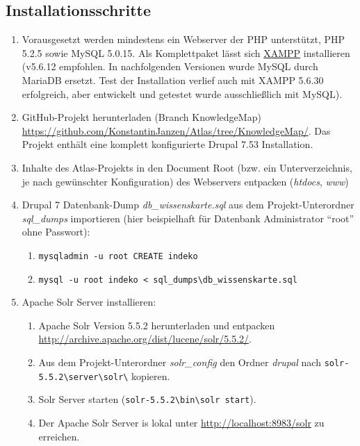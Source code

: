\subsection{Installationsschritte}
\begin{enumerate}
	\item Vorausgesetzt werden mindestens ein Webserver der PHP unterstützt, PHP 5.2.5 sowie MySQL 5.0.15. Als Komplettpaket lässt sich \zB \href{https://www.apachefriends.org/de/download.html}{XAMPP} installieren (v5.6.12 empfohlen. In nachfolgenden Versionen wurde MySQL durch MariaDB ersetzt. Test der Installation verlief auch mit XAMPP 5.6.30 erfolgreich, aber entwickelt und getestet wurde ausschließlich mit MySQL).

	\item GitHub-Projekt herunterladen (Branch KnowledgeMap) \url{https://github.com/KonstantinJanzen/Atlas/tree/KnowledgeMap/}.
	Das Projekt enthält eine komplett konfigurierte Drupal 7.53 Installation.

	\item Inhalte des Atlas-Projekts in den Document Root (bzw. ein Unterverzeichnis, je nach gewünschter Konfiguration) des Webservers entpacken (\zB \textit{htdocs}, \textit{www})

	\item Drupal 7 Datenbank-Dump \textit{db\_wissenskarte.sql} aus dem Projekt-Unterordner \textit{sql\_dumps} importieren (hier beispielhaft für Datenbank Administrator \enquote{root} ohne Passwort):
	\begin{enumerate}
		\item \lstinline|mysqladmin -u root CREATE indeko|

		\item \lstinline|mysql -u root indeko < sql_dumps\db_wissenskarte.sql|
	\end{enumerate}

	\item Apache Solr Server installieren:
	\begin{enumerate}
		\item Apache Solr Version 5.5.2 herunterladen und entpacken \url{http://archive.apache.org/dist/lucene/solr/5.5.2/}.

		\item Aus dem Projekt-Unterordner \textit{solr\_config} den Ordner \textit{drupal} nach \lstinline|solr-5.5.2\server\solr\| kopieren.

		\item Solr Server starten (\zB \lstinline|solr-5.5.2\bin\solr start|).
		\item Der Apache Solr Server is lokal unter \url{http://localhost:8983/solr} zu erreichen.
	\end{enumerate}


\end{enumerate}
